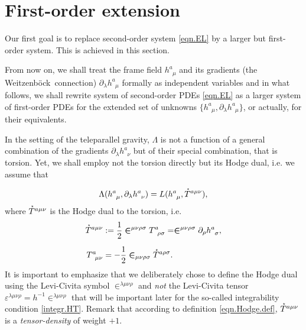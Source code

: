 \documentclass[
10pt, %
a4paper, %
oneside, %
twocolumn,
headinclude,footinclude, %
BCOR5mm, %
]{scrartcl}
\newcommand{\IP}[1]{{\color{Red}[IP:\ \ #1]}}
\newcommand{\pd}[1]{\partial_{#1}}
\newcommand{\tetrsymbol}{h}
\newcommand{\tetr}[2]{\tetrsymbol^{#1}_{\phantom{#1}#2}}
\newcommand{\detTetr}{\tetrsymbol}
\newcommand{\D}[1]{\partial_{#1}} %
\newcommand{\Tors}[2]{T^{#1}_{\phantom{#1}#2}}
\newcommand{\We}{Weitzenb\"ock}
\newcommand{\Lag}{\Lambda}	%
\newcommand{\Laghodge}{L}%
\newcommand{\LCsymb}{\bm{\in}}    %
\newcommand{\LCtens}{\varepsilon} %
\newcommand{\HDT}[1]{\accentset{\star}{T}^{#1}}
\begin{document}
	
	
	\section{First-order extension}\label{sec.PDEs}
	
	Our first goal is to replace second-order system \eqref{eqn.EL} by a larger but first-order 
	system. 
	This is achieved in this section.
	
	From now on, we shall treat the frame field $ \tetr{a}{\mu} $ and its 
	gradients (the 
	\We\ 
	connection) $ 
	\pd{\lambda}\tetr{a}{\mu} $ formally as independent variables and in what 
	follows, we shall rewrite 
	system 
	of second-order PDEs \eqref{eqn.EL} as a larger system of first-order PDEs for the extended set 
	of  
	unknowns $ \{ \tetr{a}{\mu},\pd{\lambda}\tetr{a}{\mu} \} $, or actually, for their equivalents.
	
	In the setting of the teleparallel gravity, $ \Lag $ is not a function of a general combination 
	of 
	the gradients $ \pd{\lambda}\tetr{a}{\nu} $ but of their special combination, that is torsion. 
	Yet, 
	we shall employ not the torsion directly but its Hodge dual, i.e. we assume that
	
	\begin{equation}\label{eqn.Lagrangians}
		\Lag(\tetr{a}{\mu},\pd{\lambda}\tetr{a}{\nu}) = 
		\Laghodge(\tetr{a}{\mu},\HDT{a\mu\nu}),
	\end{equation}
	where $ \HDT{a\mu\nu} $ is the Hodge dual to the 
	torsion, i.e.
	\begin{subequations}
		\begin{align}\label{eqn.Hodge.def}
			\HDT{a\mu\nu} &:= \frac{1}{2}\LCsymb^{\mu\nu\rho\sigma}\Tors{a}{\rho\sigma} = 
			\LCsymb^{\mu\nu\rho\sigma}\D{\rho}\tetr{a}{\sigma}, \\[2mm] 
			\Tors{a}{\mu\nu} &= 
			-\frac{1}{2}\LCsymb_{\mu\nu\rho\sigma}\HDT{a\rho\sigma}.
		\end{align}	
	\end{subequations}
	It is important to emphasize that we deliberately chose to define the Hodge dual using the 
	Levi-Civita symbol $ 
	\LCsymb^{\lambda\mu\nu\rho} $ and \emph{not} the Levi-Civita tensor $ 
	\LCtens^{\lambda\mu\nu\rho} = 
	\detTetr^{-1} 
	\LCsymb^{\lambda\mu\nu\rho} $ that will be important later for 
	the so-called integrability condition \eqref{integr.HT}.
	Remark that according to definition \eqref{eqn.Hodge.def}, $ \HDT{a\mu\nu} $ is a  
	\emph{tensor-density} of weight $ +1 $.
	
\end{document}
